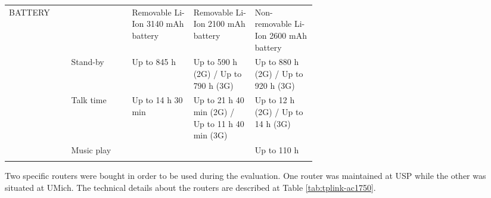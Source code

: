\begin{longtable}{llp{0.2\linewidth}p{0.2\linewidth}p{0.2\linewidth}}
		BATTERY  &               & Removable Li-Ion 3140 mAh battery               & Removable Li-Ion 2100 mAh battery                                                           & Non-removable Li-Ion 2600 mAh battery                                                                          \\
		& Stand-by      & Up to 845 h                                     & Up to 590 h (2G) / Up to 790 h (3G)                                                         & Up to 880 h (2G) / Up to 920 h (3G)                                                                            \\
		& Talk time     & Up to 14 h 30 min                               & Up to 21 h 40 min (2G) / Up to 11 h 40 min (3G)                                             & Up to 12 h (2G) / Up to 14 h (3G)                                                                              \\
		& Music play    &                                                 &                                                                                             & Up to 110 h           \\ \hline                                                                                                                                                                                    
\label{tab:gsmarena-lg-s3-z3}
\end{longtable}



Two specific routers were bought in order to be used during the evaluation. 
One router was maintained at USP while the other was situated at UMich.
The technical details about the routers are described at Table \ref{tab:tplink-ac1750}.

